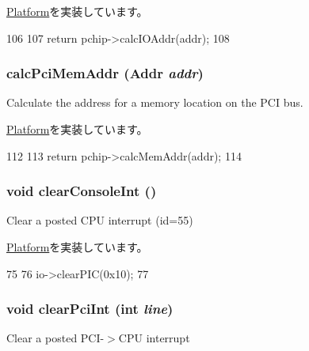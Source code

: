 \hyperlink{classPlatform_a3d1d55996e865ab1b65c732496c08b00}{Platform}を実装しています。


\begin{DoxyCode}
106 {
107    return pchip->calcIOAddr(addr);
108 }
\end{DoxyCode}
\hypertarget{classTsunami_aa2acd9bf04ba56b380e7812ce29971b5}{
\subsubsection[{calcPciMemAddr}]{ calcPciMemAddr ({\bf Addr} {\em addr})}}
\label{classTsunami_aa2acd9bf04ba56b380e7812ce29971b5}
Calculate the address for a memory location on the PCI bus. 

\hyperlink{classPlatform_a303d8161e77b31b8425cb320562a54b2}{Platform}を実装しています。


\begin{DoxyCode}
112 {
113    return pchip->calcMemAddr(addr);
114 }
\end{DoxyCode}
\hypertarget{classTsunami_ad38e46034c079c8e765d3ac7eb99337d}{
\subsubsection[{clearConsoleInt}]{\setlength{\rightskip}{0pt plus 5cm}void clearConsoleInt ()}}
\label{classTsunami_ad38e46034c079c8e765d3ac7eb99337d}
Clear a posted CPU interrupt (id=55) 

\hyperlink{classPlatform_aaf1bfcf0f5ac95c6a9d1607172a5a29e}{Platform}を実装しています。


\begin{DoxyCode}
75 {
76     io->clearPIC(0x10);
77 }
\end{DoxyCode}
\hypertarget{classTsunami_a0d98ea2b236bb883fa15d63a59a2ec9e}{
\subsubsection[{clearPciInt}]{\setlength{\rightskip}{0pt plus 5cm}void clearPciInt (int {\em line})}}
\label{classTsunami_a0d98ea2b236bb883fa15d63a59a2ec9e}
Clear a posted PCI-\/$>$CPU interrupt 

